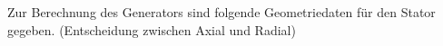 Zur Berechnung des Generators sind folgende Geometriedaten für den Stator gegeben. (Entscheidung zwischen Axial und Radial)


